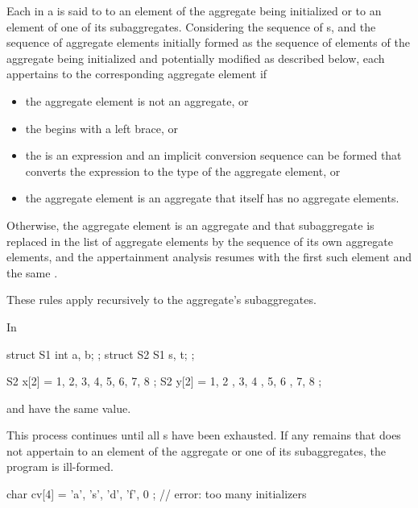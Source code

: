 \pnum
Each  in a 
is said to 
to an element of the aggregate being initialized or
to an element of one of its subaggregates.
Considering the sequence of s,
and the sequence of aggregate elements
initially formed as the sequence of elements of the aggregate being initialized
and potentially modified as described below,
each  appertains to
the corresponding aggregate element if
\begin{itemize}
\item
the aggregate element is not an aggregate, or
\item
the  begins with a left brace, or
\item
the  is an expression and
an implicit conversion sequence can be formed
that converts the expression to the type of the aggregate element, or
\item
the aggregate element is an aggregate that itself has no aggregate elements.
\end{itemize}
Otherwise,
the aggregate element is an aggregate and
that subaggregate is replaced in the list of aggregate elements by
the sequence of its own aggregate elements, and
the appertainment analysis resumes with
the first such element and the same .
\begin{note}
These rules apply recursively to the aggregate's subaggregates.
\begin{example}
In
\begin{codeblock}
struct S1 { int a, b; };
struct S2 { S1 s, t; };

S2 x[2] = { 1, 2, 3, 4, 5, 6, 7, 8 };
S2 y[2] = {
  {
    { 1, 2 },
    { 3, 4 }
  },
  {
    { 5, 6 },
    { 7, 8 }
  }
};
\end{codeblock}
 and  have the same value.
\end{example}
\end{note}
This process continues
until all s have been exhausted.
If any  remains
that does not appertain to
an element of the aggregate or one of its subaggregates,
the program is ill-formed.
\begin{example}
\begin{codeblock}
char cv[4] = { 'a', 's', 'd', 'f', 0 };     // error: too many initializers
\end{codeblock}
\end{example}

